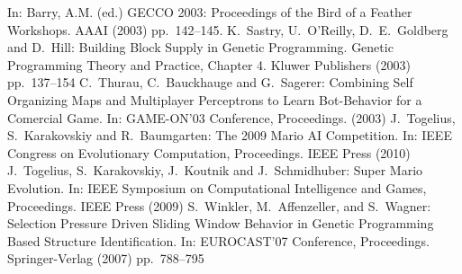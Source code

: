 \documentclass[conference]{IEEEtran}
\begin{document}
\begin{thebibliography}{11}
	In: Barry, A.M. (ed.) {GECCO 2003}: Proceedings of the Bird of a Feather Workshops.
	AAAI (2003)
	pp.~142--145.
	K.~Sastry, U.~O'Reilly, D.~E.~Goldberg and D.~Hill:
	Building Block Supply in Genetic Programming.
	Genetic Programming Theory and Practice, Chapter 4.
	Kluwer Publishers (2003)
	pp.~137--154
	C.~Thurau, C.~Bauckhauge and G.~Sagerer:
	Combining Self Organizing Maps and Multiplayer Perceptrons to Learn
	Bot-Behavior for a Comercial Game.
	In: GAME-ON'03 Conference, Proceedings. (2003)
	J.~Togelius, S.~Karakovskiy and R.~Baumgarten:
	The 2009 Mario AI Competition.
	In: IEEE Congress on Evolutionary Computation, Proceedings.
	IEEE Press (2010)
	J.~Togelius, S.~Karakovskiy, J.~Koutnik and J.~Schmidhuber:
	Super Mario Evolution.
	In: IEEE Symposium on Computational Intelligence and Games, Proceedings.
	IEEE Press (2009)
	S.~Winkler, M.~Affenzeller, and S.~Wagner:
	Selection Pressure Driven Sliding Window Behavior in Genetic
	Programming Based Structure Identification.
	In: EUROCAST'07 Conference, Proceedings.
	Springer-Verlag (2007)
	pp.~788--795
\end{thebibliography}
\end{document}
